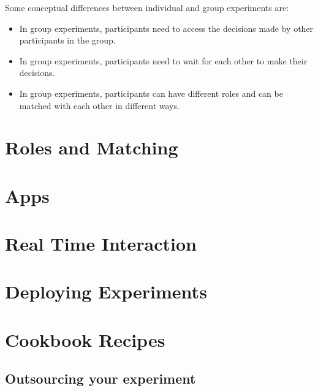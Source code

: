 \documentclass[
  letterpaper,
  DIV=11,
  numbers=noendperiod]{scrreprt}
\providecommand{\tightlist}{%
  \setlength{\itemsep}{0pt}\setlength{\parskip}{0pt}}\usepackage{longtable,booktabs,array}
\begin{document}
\begin{tcolorbox}[enhanced jigsaw, bottomrule=.15mm, titlerule=0mm, rightrule=.15mm, breakable, colframe=quarto-callout-note-color-frame, title=\textcolor{quarto-callout-note-color}{\faInfo}\hspace{0.5em}{Summary}, coltitle=black, colbacktitle=quarto-callout-note-color!10!white, colback=white, arc=.35mm, opacitybacktitle=0.6, bottomtitle=1mm, toptitle=1mm, leftrule=.75mm, toprule=.15mm, left=2mm, opacityback=0]

Some conceptual differences between individual and group experiments
are:

\begin{itemize}
\tightlist
\item
  In group experiments, participants need to access the decisions made
  by other participants in the group.
\item
  In group experiments, participants need to wait for each other to make
  their decisions.
\item
  In group experiments, participants can have different roles and can be
  matched with each other in different ways.
\end{itemize}

\end{tcolorbox}

\part{Roles and Matching}

\part{Apps}

\part{Real Time Interaction}

\part{Deploying Experiments}

\part{Cookbook Recipes}

\hypertarget{outsourcing-your-experiment}{%
\chapter{Outsourcing your
experiment}\label{outsourcing-your-experiment}}
\end{document}
